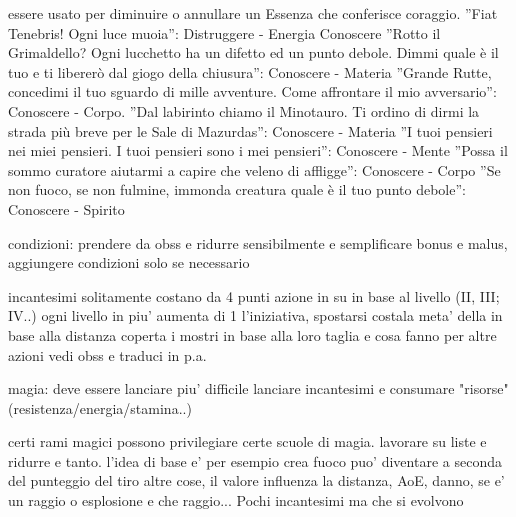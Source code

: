 \documentclass[12pt,a4paper,twoside,openany]{book}
\begin{document}
essere usato per diminuire o annullare un Essenza che conferisce coraggio. ”Fiat Tenebris! Ogni luce muoia”:
Distruggere - Energia
Conoscere
”Rotto il Grimaldello? Ogni lucchetto ha un difetto ed un punto debole. Dimmi quale è il tuo e ti libererò
dal giogo della chiusura”: Conoscere - Materia
”Grande Rutte, concedimi il tuo sguardo di mille avventure. Come affrontare il mio avversario”: Conoscere -
Corpo.
”Dal labirinto chiamo il Minotauro. Ti ordino di dirmi la strada più breve per le Sale di Mazurdas”: Conoscere
- Materia
”I tuoi pensieri nei miei pensieri. I tuoi pensieri sono i mei pensieri”: Conoscere - Mente
”Possa il sommo curatore aiutarmi a capire che veleno di affligge”: Conoscere - Corpo
”Se non fuoco, se non fulmine, immonda creatura quale è il tuo punto debole”: Conoscere - Spirito




condizioni: prendere da obss e ridurre sensibilmente  e semplificare bonus e malus, aggiungere condizioni solo se necessario

incantesimi solitamente costano da 4 punti azione in su in base  al livello (II, III; IV..) ogni livello in piu' aumenta di 1 l'iniziativa, spostarsi costala meta' della in base alla distanza coperta
i mostri in base alla loro taglia e cosa fanno
per altre azioni vedi obss e traduci in p.a.

magia: deve essere lanciare piu' difficile lanciare incantesimi e consumare "risorse" (resistenza/energia/stamina..)

certi rami magici possono privilegiare certe scuole di magia. lavorare su liste e ridurre e tanto. l'idea di base e' per esempio crea fuoco puo' diventare a seconda del punteggio del tiro altre cose, il valore influenza la distanza, AoE, danno, se e' un raggio o esplosione e che raggio...  Pochi incantesimi ma che si evolvono
\end{document}
